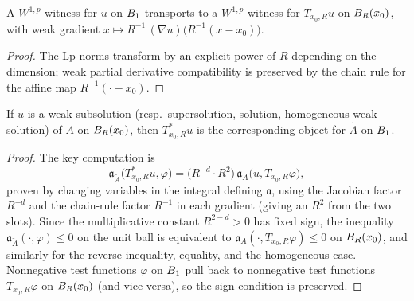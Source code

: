 \begin{lemma}
\label{lem:MemW1pWitness_transportFromUnitBall}
\leanok
{}
A $W^{1,p}$-witness for $u$ on $B_{1}$ transports to a $W^{1,p}$-witness for $T_{x_0,R} u$ on $B_{R}(x_0)$, with weak gradient $x \mapsto R^{-1}\,(\nabla u)\bigl(R^{-1}(x - x_0)\bigr)$.
\end{lemma}

\begin{proof}
\leanok
{}

The Lp norms transform by an explicit power of $R$ depending on the dimension; weak partial derivative compatibility is preserved by the chain rule for the affine map $R^{-1}(\cdot - x_0)$.
\end{proof}

\begin{theorem}
\label{thm:rescaleToUnitBall_isSubsolution}
\leanok
{}
If $u$ is a weak subsolution (resp.\ supersolution, solution, homogeneous weak solution) of $A$ on $B_{R}(x_0)$, then $T^{*}_{x_0,R} u$ is the corresponding object for $\widetilde A$ on $B_{1}$.
\end{theorem}

\begin{proof}
\leanok
{}

The key computation is
\begin{equation*}
  \mathfrak{a}_{\widetilde A}\bigl(T^{*}_{x_0,R} u, \varphi\bigr) = \bigl(R^{-d} \cdot R^{2}\bigr)\,\mathfrak{a}_{A}\bigl(u, T_{x_0,R} \varphi\bigr),
\end{equation*}
proven by changing variables in the integral defining $\mathfrak{a}$, using the Jacobian factor $R^{-d}$ and the chain-rule factor $R^{-1}$ in each gradient (giving an $R^{2}$ from the two slots). Since the multiplicative constant $R^{2-d} > 0$ has fixed sign, the inequality $\mathfrak{a}_{\widetilde A}(\cdot, \varphi) \leq 0$ on the unit ball is equivalent to $\mathfrak{a}_A(\cdot, T_{x_0,R}\varphi) \leq 0$ on $B_{R}(x_0)$, and similarly for the reverse inequality, equality, and the homogeneous case. Nonnegative test functions $\varphi$ on $B_{1}$ pull back to nonnegative test functions $T_{x_0,R}\varphi$ on $B_{R}(x_0)$ (and vice versa), so the sign condition is preserved.
\end{proof}

